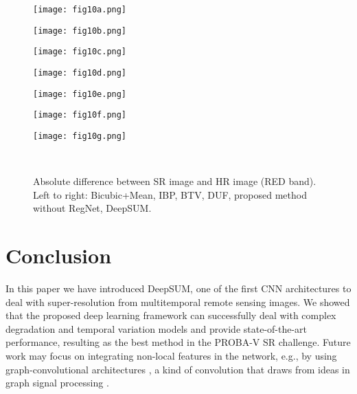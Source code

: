 \documentclass[journal]{IEEEtran}
\begin{document}
\begin{figure*}[t]
  \centering
    \begin{minipage}[b]{\textwidth}       
        \begin{minipage}[c]{0.15\textwidth}
        \texttt{[image: fig10a.png]}
        \end{minipage}
        \hfill
        \begin{minipage}[c]{0.15\textwidth}
        \texttt{[image: fig10b.png]}
        \end{minipage}
        \hfill
        \begin{minipage}[c]{0.15\textwidth}
        \texttt{[image: fig10c.png]}
        \end{minipage}\vspace{0.20cm}
        \hfill
        \begin{minipage}[c]{0.15\textwidth}
        \texttt{[image: fig10d.png]}
        \end{minipage}
        \hfill
        \begin{minipage}[c]{0.15\textwidth}
        \texttt{[image: fig10e.png]}
        \end{minipage}
        \hfill
        \begin{minipage}[c]{0.15\textwidth}
        \texttt{[image: fig10f.png]}
        \end{minipage}
        \hfill
        \begin{minipage}[c]{0.035\textwidth}
        \texttt{[image: fig10g.png]}
        \end{minipage}
        
    \end{minipage}\\
\caption{Absolute difference between SR image and HR image (RED band). Left to right: Bicubic+Mean, IBP, BTV, DUF, proposed method without RegNet, DeepSUM.}
  \label{fig:diff_red}
\end{figure*}




\section{Conclusion}
\label{sec:conclusions}
In this paper we have introduced DeepSUM, one of the first CNN architectures to deal with super-resolution from multitemporal remote sensing images. We showed that the proposed deep learning framework can successfully deal with complex degradation and temporal variation models and provide state-of-the-art performance, resulting as the best method in the PROBA-V SR challenge.
Future work may focus on integrating non-local features in the network, e.g., by using graph-convolutional architectures \cite{ValsesiaICIP19}, a kind of convolution that draws from ideas in graph signal processing \cite{shuman2013emerging,Valsesia2019Sampling}.
\end{document}
